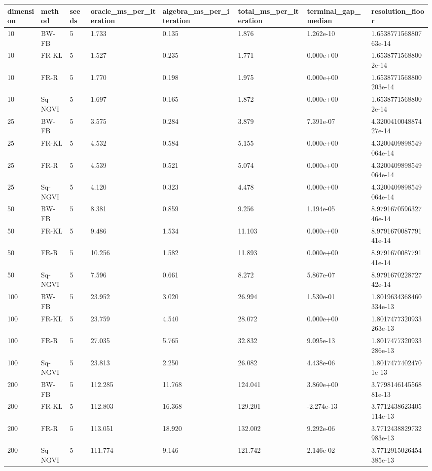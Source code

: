 \begin{tabular}{llllllll}
\toprule
dimension & method & seeds & oracle\_ms\_per\_iteration & algebra\_ms\_per\_iteration & total\_ms\_per\_iteration & terminal\_gap\_median & resolution\_floor \\
\midrule
10 & BW-FB & 5 & 1.733 & 0.135 & 1.876 & 1.262e-10 & 1.653877156880763e-14 \\
10 & FR-KL & 5 & 1.527 & 0.235 & 1.771 & 0.000e+00 & 1.65387715688002e-14 \\
10 & FR-R & 5 & 1.770 & 0.198 & 1.975 & 0.000e+00 & 1.6538771568800203e-14 \\
10 & Sq-NGVI & 5 & 1.697 & 0.165 & 1.872 & 0.000e+00 & 1.65387715688002e-14 \\
25 & BW-FB & 5 & 3.575 & 0.284 & 3.879 & 7.391e-07 & 4.320041004887427e-14 \\
25 & FR-KL & 5 & 4.532 & 0.584 & 5.155 & 0.000e+00 & 4.3200409898549064e-14 \\
25 & FR-R & 5 & 4.539 & 0.521 & 5.074 & 0.000e+00 & 4.3200409898549064e-14 \\
25 & Sq-NGVI & 5 & 4.120 & 0.323 & 4.478 & 0.000e+00 & 4.3200409898549064e-14 \\
50 & BW-FB & 5 & 8.381 & 0.859 & 9.256 & 1.194e-05 & 8.979167059632746e-14 \\
50 & FR-KL & 5 & 9.486 & 1.534 & 11.103 & 0.000e+00 & 8.979167008779141e-14 \\
50 & FR-R & 5 & 10.256 & 1.582 & 11.893 & 0.000e+00 & 8.979167008779141e-14 \\
50 & Sq-NGVI & 5 & 7.596 & 0.661 & 8.272 & 5.867e-07 & 8.979167022872742e-14 \\
100 & BW-FB & 5 & 23.952 & 3.020 & 26.994 & 1.530e-01 & 1.8019634368460334e-13 \\
100 & FR-KL & 5 & 23.759 & 4.540 & 28.072 & 0.000e+00 & 1.8017477320933263e-13 \\
100 & FR-R & 5 & 27.035 & 5.765 & 32.832 & 9.095e-13 & 1.8017477320933286e-13 \\
100 & Sq-NGVI & 5 & 23.813 & 2.250 & 26.082 & 4.438e-06 & 1.80174774024701e-13 \\
200 & BW-FB & 5 & 112.285 & 11.768 & 124.041 & 3.860e+00 & 3.779814614556881e-13 \\
200 & FR-KL & 5 & 112.803 & 16.368 & 129.201 & -2.274e-13 & 3.7712438623405114e-13 \\
200 & FR-R & 5 & 113.051 & 18.920 & 132.002 & 9.292e-06 & 3.7712438829732983e-13 \\
200 & Sq-NGVI & 5 & 111.774 & 9.146 & 121.742 & 2.146e-02 & 3.7712915026454385e-13 \\
\bottomrule
\end{tabular}
